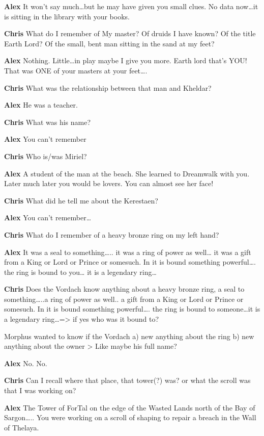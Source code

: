 {\bf Alex }	
It won't say much\dots but he may have given you small clues.
No data now\dots it is sitting in the library with your books.

{\bf Chris} 
What do I remember of My master? Of druids I have known? Of the title 
Earth Lord? Of the small, bent man sitting in the sand at my feet?

{\bf Alex }	
Nothing. Little\dots in play maybe I give you more. Earth lord\- 
that's YOU! That was ONE of your masters at your feet\dots.

{\bf Chris} 
What was the relationship between that man and Kheldar?

{\bf Alex }	
He was a teacher.

{\bf Chris} What was his name?

{\bf Alex }	
You can't remember

{\bf Chris}
Who is/was Miriel?

{\bf Alex }	
A student of the man at the beach. She learned to Dreamwalk with you. 
Later\- much later\- you would be lovers. You can almost see her face!

{\bf Chris}
What did he tell me about the Kerestaen?

{\bf Alex }	
You can't remember\dots

{\bf Chris}
What do I remember of a heavy bronze ring on my left hand?

{\bf Alex }	
It was a seal to something\dots.. it was a ring of power as well\dots
it was a gift from a King or Lord or Prince or somesuch. In it is 
bound something powerful\dots. the ring is bound to you\dots 
it is a legendary ring\dots

{\bf Chris}
Does the Vordach know anything about a heavy bronze ring, a seal to 
something\dots..a ring of power as well.. a gift from a King or Lord 
or Prince or somesuch. In it is bound something powerful\dots. 
the ring is bound to someone\dots it is a legendary ring\dots=> if yes 
who was it bound to?

Morphus wanted to know if the Vordach
a) new anything about the ring
b) new anything about the owner \-\-> Like maybe his full name?

{\bf Alex }
No. No.

{\bf Chris}
Can I recall where that place, that tower(?) was? or what the scroll 
was that I was working on?

{\bf Alex }	
The Tower of ForTal on the edge of the Wasted Lands north of the 
Bay of Sargon\dots.. You were working on a scroll of shaping to 
repair a breach in the Wall of Thelaya.

